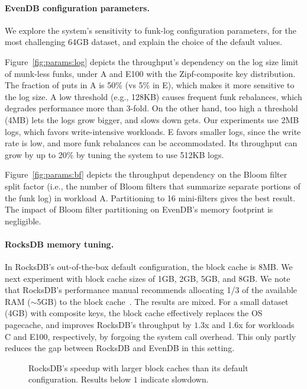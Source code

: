 \documentclass[sigplan,10pt]{acmart}
\newcommand{\inred}[1]{{\color{red}{#1}}}
\newcommand{\sys}{EvenDB}
\begin{document}
\paragraph{\sys\/ configuration parameters.} 
We explore the system's  sensitivity to funk-log configuration parameters, for the most challenging 64GB dataset, 
and explain the choice of the default values.

Figure~\ref{fig:params:log} depicts the throughput's dependency on the log size limit of munk-less funks, 
under  A and E100  with the Zipf-composite key distribution. 
The fraction of puts in A is 50\% (vs 5\% in E), which makes it more sensitive to the log size. 
A low threshold (e.g., 128KB) causes frequent funk rebalances, which degrades performance more than 3-fold. 
On the other hand, too high a threshold (4MB) lets the logs grow bigger, and slows down gets. Our experiments  
use 2MB logs, which favors write-intensive workloads. E favors smaller logs, since the write 
rate is low, and more funk rebalances can be accommodated. Its throughput can  grow by up to 20\% 
by tuning the system to use 512KB logs.

Figure~\ref{fig:params:bf} depicts the throughput dependency on the Bloom filter split factor (i.e., the 
number of Bloom filters that summarize separate portions of the funk log) in workload A. 
Partitioning to 16 mini-filters gives the best result.  
The impact of Bloom filter partitioning on \sys's %
memory footprint is negligible.

\paragraph{RocksDB memory tuning.} In RocksDB's out-of-the-box default configuration, the block cache is 8MB. 
We next experiment with block cache sizes of 1GB, 2GB, 5GB, and 8GB. We note that 
RocksDB's performance manual recommends allocating 1/3 of the available RAM 
($\sim$5GB) to the block cache~\cite{RocksDBMemoryTuning}.
The results are mixed. For a small 
dataset (4GB) with composite keys, the block cache effectively replaces 
the OS pagecache, and improves RocksDB's throughput by $1.3$x and 1.6x
for workloads C and E100, respectively, by forgoing the system call overhead. This only partly reduces the gap between
RocksDB and \sys\/ in this setting. 

\begin{figure}[htb]
\inred{Eran please add a graph}
\caption{RocksDB's speedup with larger block caches than its default configuration. Results below $1$ indicate slowdown.}
\label{fig:rocks-memory}
\end{figure}
\end{document}
